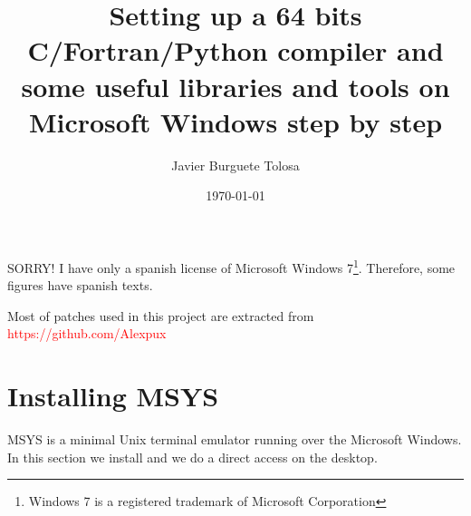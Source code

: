 \documentclass[a4paper]{article}
\title{Setting up a 64 bits C/Fortran/Python compiler and some useful libraries
and tools on Microsoft Windows step by step}
\author{Javier Burguete Tolosa}
\date{\today}
\newcommand{\RED}[1] {\textcolor{red}{#1}}
\begin{document}
\maketitle

\tableofcontents

\section*{}

SORRY! I have only a spanish license of Microsoft Windows 7\footnote{Windows 7
is a registered trademark of Microsoft Corporation}. Therefore, some figures
have spanish texts.

Most of patches used in this project are extracted from
\RED{https://github.com/Alexpux}

\clearpage

\section{Installing MSYS}

MSYS is a minimal Unix terminal emulator running over the Microsoft Windows. In
this section we install and we do a direct access on the desktop.
\end{document}
